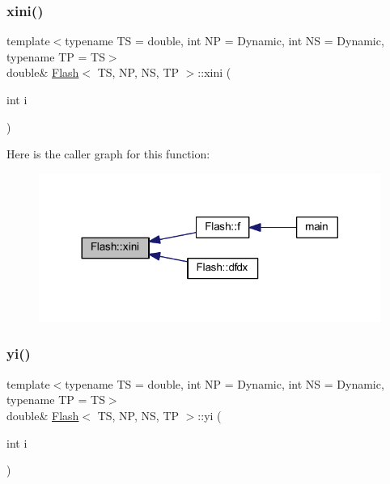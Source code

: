 \subsubsection{\texorpdfstring{xini()}{xini()}}
{\footnotesize\ttfamily template$<$typename TS = double, int NP = Dynamic, int NS = Dynamic, typename TP = TS$>$ \\
double\& \mbox{\hyperlink{class_flash}{Flash}}$<$ TS, NP, NS, TP $>$\+::xini (\begin{DoxyParamCaption}\item[{int}]{i }\end{DoxyParamCaption})\hspace{0.3cm}{\ttfamily [inline]}}

Here is the caller graph for this function\+:
\nopagebreak
\begin{figure}[H]
\begin{center}
\leavevmode
\includegraphics[width=317pt]{class_flash_ade19a84735d622bd8fcc10bc37ed5cdd_icgraph}
\end{center}
\end{figure}
\mbox{\label{class_flash_a2af985b9562aa54cbc5c3dfd2f4292ef}} 
\subsubsection{\texorpdfstring{yi()}{yi()}}
{\footnotesize\ttfamily template$<$typename TS = double, int NP = Dynamic, int NS = Dynamic, typename TP = TS$>$ \\
double\& \mbox{\hyperlink{class_flash}{Flash}}$<$ TS, NP, NS, TP $>$\+::yi (\begin{DoxyParamCaption}\item[{int}]{i }\end{DoxyParamCaption})\hspace{0.3cm}{\ttfamily [inline]}}

